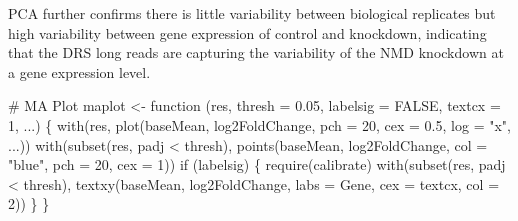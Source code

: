 \documentclass[
  letterpaper,
  DIV=11,
  numbers=noendperiod]{scrartcl}
\newenvironment{Shaded}{\begin{snugshade}}{\end{snugshade}}
\newcommand{\AttributeTok}[1]{\textcolor[rgb]{0.40,0.45,0.13}{#1}}
\newcommand{\CommentTok}[1]{\textcolor[rgb]{0.37,0.37,0.37}{#1}}
\newcommand{\ConstantTok}[1]{\textcolor[rgb]{0.56,0.35,0.01}{#1}}
\newcommand{\ControlFlowTok}[1]{\textcolor[rgb]{0.00,0.23,0.31}{#1}}
\newcommand{\DecValTok}[1]{\textcolor[rgb]{0.68,0.00,0.00}{#1}}
\newcommand{\FloatTok}[1]{\textcolor[rgb]{0.68,0.00,0.00}{#1}}
\newcommand{\FunctionTok}[1]{\textcolor[rgb]{0.28,0.35,0.67}{#1}}
\newcommand{\NormalTok}[1]{\textcolor[rgb]{0.00,0.23,0.31}{#1}}
\newcommand{\OtherTok}[1]{\textcolor[rgb]{0.00,0.23,0.31}{#1}}
\newcommand{\SpecialCharTok}[1]{\textcolor[rgb]{0.37,0.37,0.37}{#1}}
\newcommand{\StringTok}[1]{\textcolor[rgb]{0.13,0.47,0.30}{#1}}
\begin{document}
PCA further confirms there is little variability between biological
replicates but high variability between gene expression of control and
knockdown, indicating that the DRS long reads are capturing the
variability of the NMD knockdown at a gene expression level.

\begin{Shaded}
\begin{Highlighting}[]
\CommentTok{\# MA Plot}
\NormalTok{maplot }\OtherTok{\textless{}{-}} \ControlFlowTok{function}\NormalTok{ (res, }\AttributeTok{thresh =} \FloatTok{0.05}\NormalTok{, }\AttributeTok{labelsig =} \ConstantTok{FALSE}\NormalTok{, }\AttributeTok{textcx =} \DecValTok{1}\NormalTok{, ...) \{}
  \FunctionTok{with}\NormalTok{(res, }\FunctionTok{plot}\NormalTok{(baseMean, log2FoldChange, }\AttributeTok{pch =} \DecValTok{20}\NormalTok{, }\AttributeTok{cex =} \FloatTok{0.5}\NormalTok{, }\AttributeTok{log =} \StringTok{"x"}\NormalTok{, ...))}
  \FunctionTok{with}\NormalTok{(}\FunctionTok{subset}\NormalTok{(res, padj }\SpecialCharTok{\textless{}}\NormalTok{ thresh), }\FunctionTok{points}\NormalTok{(baseMean, log2FoldChange, }\AttributeTok{col =} \StringTok{"blue"}\NormalTok{, }\AttributeTok{pch =} \DecValTok{20}\NormalTok{, }\AttributeTok{cex =} \DecValTok{1}\NormalTok{))}
  \ControlFlowTok{if}\NormalTok{ (labelsig) \{}
    \FunctionTok{require}\NormalTok{(calibrate)}
    \FunctionTok{with}\NormalTok{(}\FunctionTok{subset}\NormalTok{(res, padj }\SpecialCharTok{\textless{}}\NormalTok{ thresh), }\FunctionTok{textxy}\NormalTok{(baseMean, log2FoldChange, }\AttributeTok{labs =}\NormalTok{ Gene, }\AttributeTok{cex =}\NormalTok{ textcx, }\AttributeTok{col =} \DecValTok{2}\NormalTok{))}
\NormalTok{  \}}
\NormalTok{\}}


\end{Highlighting}
\end{Shaded}
\end{document}
